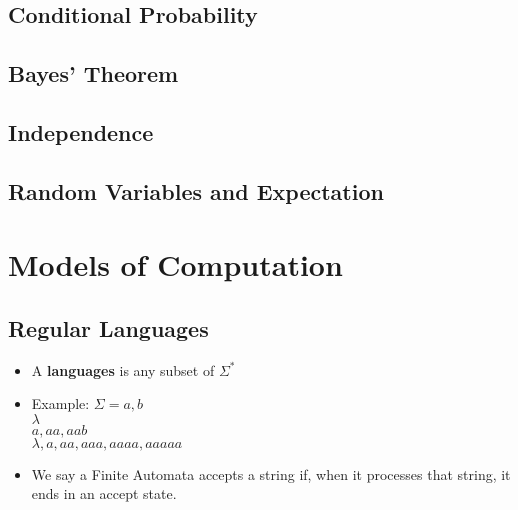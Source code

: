 \documentclass[a4paper]{article}
\begin{document}
\begin{multicols}{2}
	\subsection{Conditional Probability}
	\subsection{Bayes' Theorem}
	\subsection{Independence}
	\subsection{Random Variables and Expectation}

	\section{Models of Computation}
	\subsection{Regular Languages}
	\begin{itemize}
		\item A \textbf{languages} is any subset of $\Sigma^*$
		\item Example: $\Sigma = {a, b}$ \\
					${\lambda}$ \\
					${a, aa, aab}$ \\
					${\lambda, a, aa, aaa, aaaa, aaaaa}$ \\
		\item We say a Finite Automata accepts a string if, when it processes that
					string, it ends in an accept state.
	\end{itemize}

\end{multicols}
\end{document}
